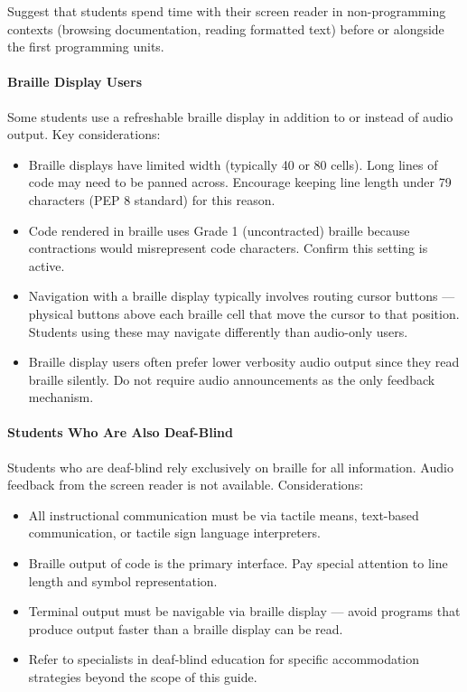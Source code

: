 \documentclass[
  justified,
  openright,
]{tufte-book}
\let\subsubsection\paragraph
\let\paragraph\paragraph
\let\subsubsection\paragraph
\let\paragraph\paragraph
\providecommand{\tightlist}{%
  \setlength{\itemsep}{0pt}\setlength{\parskip}{0pt}}
\begin{document}
Suggest that students spend time with their screen reader in
non-programming contexts (browsing documentation, reading formatted
text) before or alongside the first programming units.

\subsubsection{Braille Display Users}\label{braille-display-users}

Some students use a refreshable braille display in addition to or
instead of audio output. Key considerations:

\begin{itemize}
\tightlist
\item
  Braille displays have limited width (typically 40 or 80 cells). Long
  lines of code may need to be panned across. Encourage keeping line
  length under 79 characters (PEP 8 standard) for this reason.
\item
  Code rendered in braille uses Grade 1 (uncontracted) braille because
  contractions would misrepresent code characters. Confirm this setting
  is active.
\item
  Navigation with a braille display typically involves routing cursor
  buttons --- physical buttons above each braille cell that move the
  cursor to that position. Students using these may navigate differently
  than audio-only users.
\item
  Braille display users often prefer lower verbosity audio output since
  they read braille silently. Do not require audio announcements as the
  only feedback mechanism.
\end{itemize}

\subsubsection{Students Who Are Also
Deaf-Blind}\label{students-who-are-also-deaf-blind}

Students who are deaf-blind rely exclusively on braille for all
information. Audio feedback from the screen reader is not available.
Considerations:

\begin{itemize}
\tightlist
\item
  All instructional communication must be via tactile means, text-based
  communication, or tactile sign language interpreters.
\item
  Braille output of code is the primary interface. Pay special attention
  to line length and symbol representation.
\item
  Terminal output must be navigable via braille display --- avoid
  programs that produce output faster than a braille display can be
  read.
\item
  Refer to specialists in deaf-blind education for specific
  accommodation strategies beyond the scope of this guide.
\end{itemize}
\end{document}
